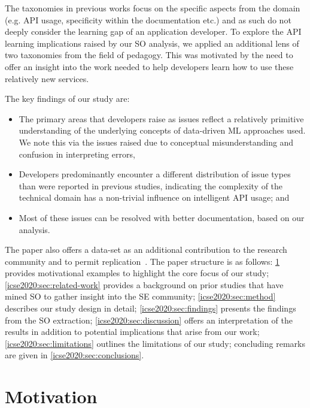 The taxonomies in previous works focus on the specific aspects from the domain (e.g. API usage, specificity within the documentation etc.) and as such do not deeply consider the learning gap of an application developer.
To explore the API learning implications raised by our SO analysis, we applied an additional lens of two taxonomies from the field of pedagogy. This was motivated by the need to offer an insight into the work needed to help developers learn how to use these relatively new services.

The key findings of our study are:
\begin{itemize}
\item The primary areas that developers raise as issues reflect a relatively primitive understanding of the underlying concepts of data-driven ML approaches used. We note this via the issues raised due to conceptual misunderstanding and confusion in interpreting errors,
\item Developers predominantly encounter a different distribution of issue types than were reported in previous studies, indicating the complexity of the technical domain has a non-trivial influence on intelligent API usage; and
\item Most of these issues can be resolved with better documentation, based on our analysis.
\end{itemize}

The paper also offers a data-set as an additional contribution to the research community and to permit replication~. The paper structure is as follows: \cref{icse2020:sec:motivation} provides motivational examples to highlight the core focus of our study; \cref{icse2020:sec:related-work} provides a background on prior studies that have mined SO to gather insight into the SE community; \cref{icse2020:sec:method} describes our study design in detail; \cref{icse2020:sec:findings} presents the findings from the SO extraction; \cref{icse2020:sec:discussion} offers an interpretation of the results in addition to potential implications that arise from our work; \cref{icse2020:sec:limitations} outlines the limitations of our study; concluding remarks are given in \cref{icse2020:sec:conclusions}.

\section{Motivation}
\label{icse2020:sec:motivation}

